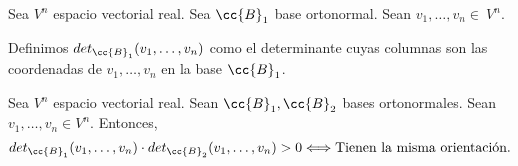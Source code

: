 \begin{definicion}
    Sea $V^n$ espacio vectorial real. Sea $\cc{B}_1$ base ortonormal. Sean $v_1,\dots,v_n\in~V^n$.

    Definimos $det_{\cc{B}_1} (v_1,\dots,v_n)$ como el determinante cuyas columnas son las coordenadas de $v_1,\dots,v_n$ en la base $\cc{B}_1$.
\end{definicion}

\begin{prop}
    Sea $V^n$ espacio vectorial real. Sean $\cc{B}_1,\cc{B}_2$ bases ortonormales. Sean $v_1,\dots,v_n\in V^n$. Entonces,
    \begin{equation*}
        det_{\cc{B}_1} (v_1,\dots,v_n) \cdot det_{\cc{B}_2} (v_1,\dots,v_n) > 0 \Longleftrightarrow \text{Tienen la misma orientación.}
    \end{equation*}
\end{prop}
